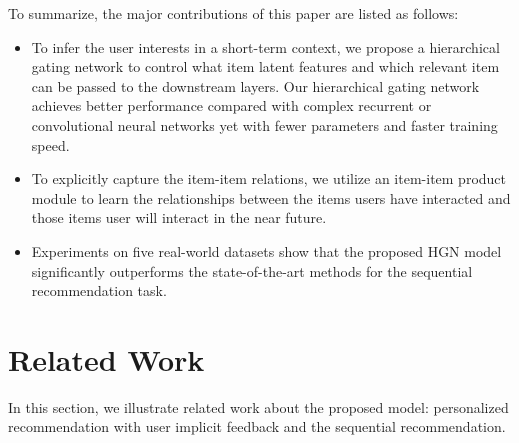 \documentclass[sigconf]{acmart}
\begin{document}
To summarize, the major contributions of this paper are listed as follows:
\begin{itemize}[leftmargin=*]
\item To infer the user interests in a short-term context, we propose a hierarchical gating network to control what item latent features and which relevant item can be passed to the downstream layers. Our hierarchical gating network achieves better performance compared with complex recurrent or convolutional neural networks yet with fewer parameters and faster training speed.
\item To explicitly capture the item-item relations, we utilize an item-item product module to learn the relationships between the items users have interacted and those items user will interact in the near future.
\item Experiments on five real-world datasets show that the proposed HGN model significantly outperforms the state-of-the-art methods for the sequential recommendation task.
\end{itemize}



 




 
\section{Related Work}
In this section, we illustrate related work about the proposed model: personalized recommendation with user implicit feedback and the sequential recommendation.
\end{document}
